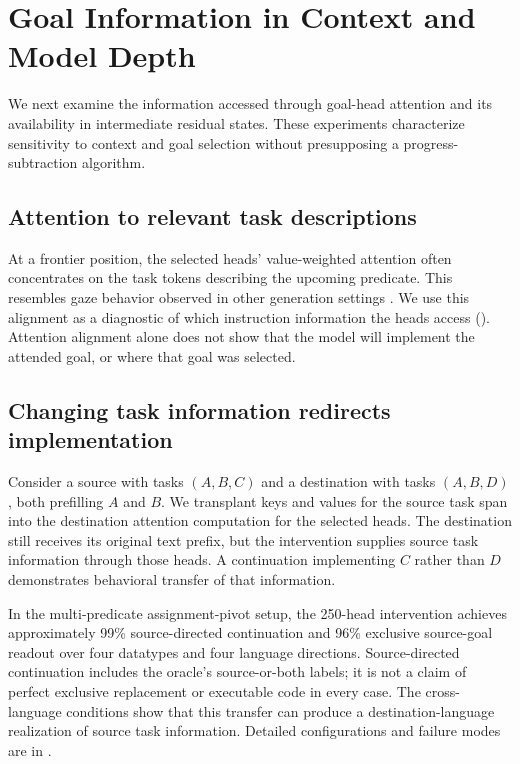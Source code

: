 \section{Goal Information in Context and Model Depth}
\label{sec:mechanism}
\label{sec:steer}
We next examine the information accessed through goal-head attention and its availability in intermediate residual states. These experiments characterize sensitivity to context and goal selection without presupposing a progress-subtraction algorithm.

\subsection{Attention to relevant task descriptions}
\label{sec:mechanism:gaze}
At a frontier position, the selected heads' value-weighted attention often concentrates on the task tokens describing the upcoming predicate. This resembles gaze behavior observed in other generation settings \citep{gandikota2026gaze}. We use this alignment as a diagnostic of which instruction information the heads access (). Attention alignment alone does not show that the model will implement the attended goal, or where that goal was selected.

\subsection{Changing task information redirects implementation}
\label{sec:steer:transplant}
\label{sec:steer:crosslang}
Consider a source with tasks $(A,B,C)$ and a destination with tasks $(A,B,D)$, both prefilling $A$ and $B$. We transplant keys and values for the source task span into the destination attention computation for the selected heads. The destination still receives its original text prefix, but the intervention supplies source task information through those heads. A continuation implementing $C$ rather than $D$ demonstrates behavioral transfer of that information.

In the multi-predicate assignment-pivot setup, the 250-head intervention achieves approximately 99\% source-directed continuation and 96\% exclusive source-goal readout over four datatypes and four language directions. Source-directed continuation includes the oracle's source-or-both labels; it is not a claim of perfect exclusive replacement or executable code in every case. The cross-language conditions show that this transfer can produce a destination-language realization of source task information. Detailed configurations and failure modes are in .

